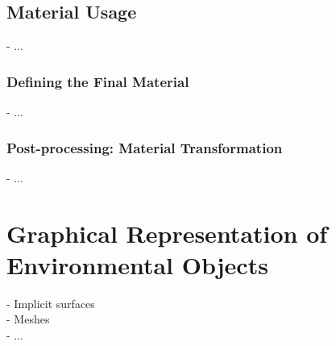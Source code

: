 \subsection{Material Usage}
- ...

\subsubsection{Defining the Final Material}
- ...

\subsubsection{Post-processing: Material Transformation}
- ...

\section{Graphical Representation of Environmental Objects}
\label{sec:volumic-modeling_graphic-representation-env-objects}
- Implicit surfaces \\
- Meshes \\
- ...
